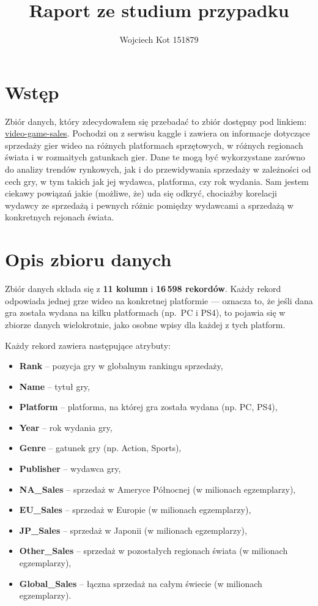 \documentclass[11pt]{article}
\title{Raport ze studium przypadku}
\author{Wojciech Kot 151879}
\date{}
\begin{document}
\maketitle
\newpage

\section{Wstęp}\label{sec:wstep}

Zbiór danych, który zdecydowałem się przebadać to zbiór dostępny pod linkiem:
\href{https://www.kaggle.com/datasets/anandshaw2001/video-game-sales}{video-game-sales}.
Pochodzi on z serwisu kaggle i zawiera on informacje dotyczące sprzedaży gier wideo na różnych platformach sprzętowych,
w różnych regionach świata i w rozmaitych gatunkach gier.
Dane te mogą być wykorzystane zarówno do analizy trendów rynkowych,
jak i do przewidywania sprzedaży w zależności od cech gry, w tym takich jak jej wydawca, platforma, czy rok wydania.
Sam jestem ciekawy powiązań jakie (możliwe, że) uda się odkryć,
chociażby korelacji wydawcy ze sprzedażą i pewnych różnic pomiędzy wydawcami a sprzedażą w konkretnych rejonach świata.

\section{Opis zbioru danych}\label{sec:opis-zbioru-danych}

Zbiór danych składa się z \textbf{11 kolumn} i \textbf{16\,598 rekordów}.
Każdy rekord odpowiada jednej grze wideo na konkretnej platformie — oznacza to,
że jeśli dana gra została wydana na kilku platformach (np.\ PC i PS4),
to pojawia się w zbiorze danych wielokrotnie, jako osobne wpisy dla każdej z tych platform.

Każdy rekord zawiera następujące atrybuty:
\begin{itemize}
  \item \textbf{Rank} – pozycja gry w globalnym rankingu sprzedaży,
  \item \textbf{Name} – tytuł gry,
  \item \textbf{Platform} – platforma, na której gra została wydana (np. PC, PS4),
  \item \textbf{Year} – rok wydania gry,
  \item \textbf{Genre} – gatunek gry (np. Action, Sports),
  \item \textbf{Publisher} – wydawca gry,
  \item \textbf{NA\_Sales} – sprzedaż w Ameryce Północnej (w milionach egzemplarzy),
  \item \textbf{EU\_Sales} – sprzedaż w Europie (w milionach egzemplarzy),
  \item \textbf{JP\_Sales} – sprzedaż w Japonii (w milionach egzemplarzy),
  \item \textbf{Other\_Sales} – sprzedaż w pozostałych regionach świata (w milionach egzemplarzy),
  \item \textbf{Global\_Sales} – łączna sprzedaż na całym świecie (w milionach egzemplarzy).
\end{itemize}
\end{document}
